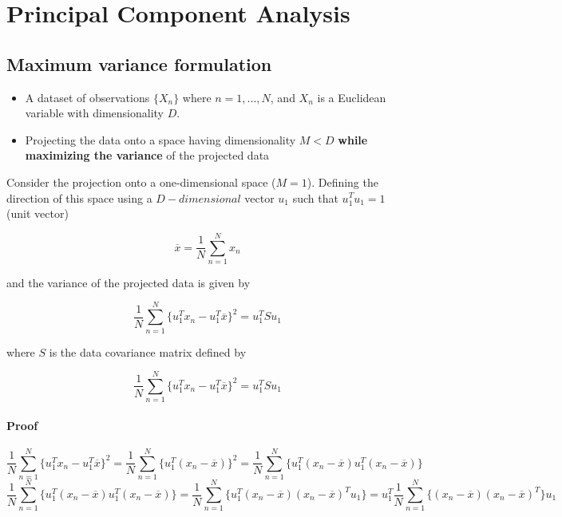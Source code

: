 \chapter{Principal Component Analysis}
\section{Maximum variance formulation}

\begin{itemize}
    \item A dataset of observations $\{X_n\}$ where $n = 1, ..., N$, and $X_n$ is a Euclidean variable with dimensionality $D$.
    \item Projecting the data onto a space having dimensionality $M<D$ \textbf{while maximizing the variance} of the projected data
\end{itemize}
 
 \begin{flushleft}
 Consider the projection onto a one-dimensional space ($M=1$).
 Defining the direction of this space using a $D-dimensional$ vector $u_1$ such that $u_1^Tu_1=1$ (unit vector)
 \end{flushleft}

\begin{equation}
    \label{eq:PCA_mean_vector}
    \overline{x} = \frac{1}{N}\sum_{n=1}^{N} x_n
\end{equation}

and the variance of the projected data is given by

\begin{equation}
    \label{eq:PCA_variance}
    \frac{1}{N}\sum_{n=1}^{N} \{u_1^Tx_n - u_1^T \overline{x}\}^2=u_1^TSu_1
\end{equation}

where $S$ is the data covariance matrix defined by

\begin{equation}
    \label{eq:PCA_covariance_matrix}
    \frac{1}{N}\sum_{n=1}^{N} \{u_1^Tx_n - u_1^T \overline{x}\}^2=u_1^TSu_1
\end{equation}

\subsubsection{Proof}
\begin{equation}
    \label{eq:PCA_covariance_proof}
    \frac{1}{N}\sum_{n=1}^{N} \{u_1^Tx_n - u_1^T \overline{x}\}^2=\frac{1}{N}\sum_{n=1}^{N}\{u_1^T(x_n - \overline{x})\}^2=\frac{1}{N}\sum_{n=1}^{N}\{u_1^T(x_n - \overline{x})u_1^T(x_n - \overline{x})\}
\end{equation}
\begin{equation}
    \label{eq:PCA_covariance_proof}
    \frac{1}{N}\sum_{n=1}^{N}\{u_1^T(x_n - \overline{x})u_1^T(x_n - \overline{x})\}=\frac{1}{N}\sum_{n=1}^{N}\{u_1^T(x_n - \overline{x})(x_n - \overline{x})^Tu_1\}=u_1^T\frac{1}{N}\sum_{n=1}^{N}\{(x_n - \overline{x})(x_n - \overline{x})^T\}u_1
\end{equation}

